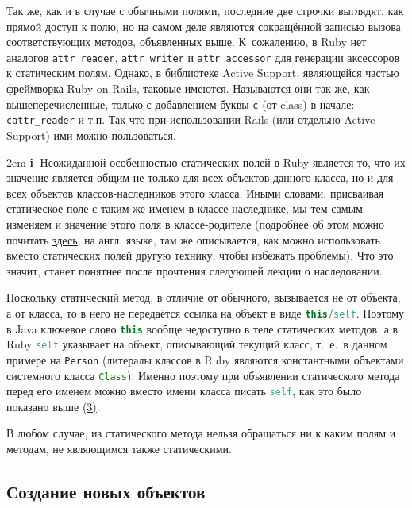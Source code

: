 \documentclass[a4paper, 14pt, titlepage]{extarticle}
\newcommand{\ie}{т.~е.~}
\newenvironment{indented}%
    { \begingroup %
        \noindent %
        \leftskip2em %
        \rightskip\leftskip }%
    { \par\endgroup }
\newenvironment{extrainfo}%
    { \begin{indented} %
        \color{dkblue} %
        \small %
        \textbf{\textcircled{\footnotesize i}} }%
    { \end{indented} }
\newcommand{\inlinecode}[2][Java]{\lstinline[basicstyle=\ttfamily, language=#1]{#2}}
\begin{document}
  Так же, как и в случае с обычными полями, последние две строчки выглядят, как прямой доступ к полю,
  но на самом деле являются сокращённой записью вызова соответствующих методов, объявленных выше.
  К~сожалению, в Ruby нет аналогов \inlinecode{attr_reader}, \inlinecode{attr_writer} и
  \inlinecode{attr_accessor} для генерации аксессоров к статическим полям. Однако, в
  библиотеке Active Support, являющейся частью фреймворка Ruby on Rails, таковые имеются. Называются
  они так же, как вышеперечисленные, только с добавлением буквы \inlinecode{c} (от class) в начале: 
  \inlinecode{cattr_reader} и т.п. Так что при использовании Rails (или отдельно Active Support) ими
  можно пользоваться.

  \begin{extrainfo}
    Неожиданной особенностью статических полей в Ruby является то, что их значение является общим
    не только для всех объектов данного класса, но и для всех объектов классов-наследников этого
    класса. Иными словами, присваивая статическое поле с таким же именем в классе-наследнике, мы
    тем самым изменяем и значение этого поля в классе-родителе (подробнее об этом можно почитать 
    \href{http://apidock.com/rails/Class/cattr_accessor#624-Important-note}{\uline{здесь}}, на англ.
    языке, там же описывается, как можно использовать вместо статических полей другую технику, чтобы
    избежать проблемы). Что это значит, станет понятнее после прочтения следующей лекции о наследовании.
  \end{extrainfo}

  Поскольку статический метод, в отличие от обычного, вызывается не от объекта, а от класса, то в
  него не передаётся ссылка на объект в виде \inlinecode[Java]{this}/\inlinecode[Ruby]{self}.
  Поэтому в Java ключевое слово \inlinecode[Java]{this} вообще недоступно в теле статических методов,
  а в Ruby \inlinecode[Ruby]{self} указывает на объект, описывающий текущий класс, \ie в данном
  примере на \inlinecode{Person} (литералы классов в Ruby являются константными объектами системного
  класса \inlinecode{Class}). Именно поэтому при объявлении статического метода перед его именем
  можно вместо имени класса писать \inlinecode[Ruby]{self}, как это было показано выше \hyperref[lst:static_self]{(3)}.

  В любом случае, из статического метода нельзя обращаться ни к каким полям и методам, не являющимся
  также статическими.

  \subsection{Создание новых объектов}
\end{document}
